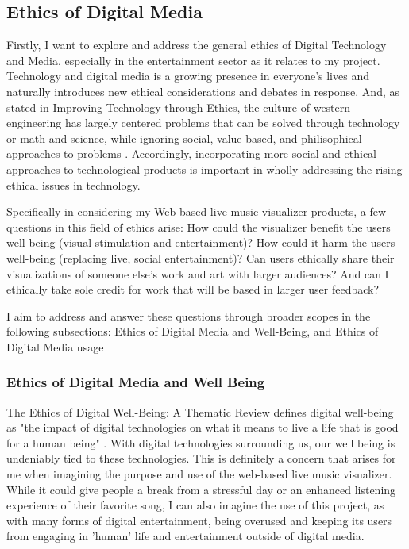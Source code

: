 \documentclass[10pt,twocolumn]{article}
\begin{document}
\subsection{Ethics of Digital Media}
Firstly, I want to explore and address the general ethics of Digital Technology and Media, especially in the entertainment sector as it relates to my project. Technology and digital media is a growing presence in everyone's lives and naturally introduces new ethical considerations and debates in response. And, as stated in Improving Technology through Ethics, the culture of western engineering has largely centered problems that can be solved through technology or math and science, while ignoring social, value-based, and philisophical approaches to problems \cite{ProQuest}. Accordingly, incorporating more social and ethical approaches to technological products is important in wholly addressing the rising ethical issues in technology. 

Specifically in considering my Web-based live music visualizer products, a few questions in this field of ethics arise: How could the visualizer benefit the users well-being (visual stimulation and entertainment)? How could it harm the users well-being (replacing live, social entertainment)? Can users ethically share their visualizations of someone else's work and art with larger audiences? And can I ethically take sole credit for work that will be based in larger user feedback?

I aim to address and answer these questions through broader scopes in the following subsections: Ethics of Digital Media and Well-Being, and Ethics of Digital Media usage
\subsubsection{Ethics of Digital Media and Well Being}
The Ethics of Digital Well-Being: A Thematic Review defines digital well-being as "the impact of digital technologies on what it means to live a life that is good for a human being" \cite{nihEthicsDigital}. With digital technologies surrounding us, our well being is undeniably tied to these technologies. This is definitely a concern that arises for me when imagining the purpose and use of the web-based live music visualizer. While it could give people a break from a stressful day or an enhanced listening experience of their favorite song, I can also imagine the use of this project, as with many forms of digital entertainment, being overused and keeping its users from engaging in 'human' life and entertainment outside of digital media. 
\end{document}
